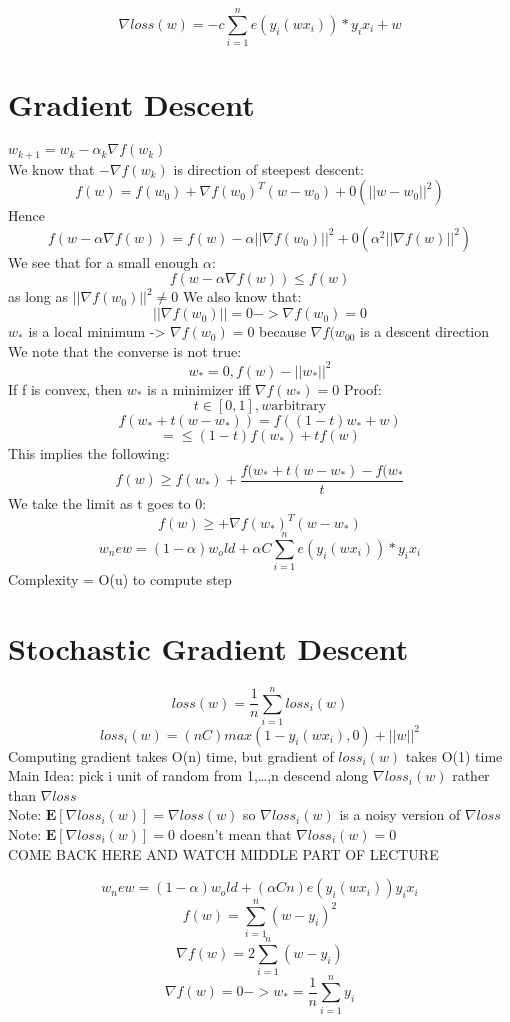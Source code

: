 \documentclass{article}
\begin{document}
$$\nabla loss(w) = -c \sum_{i=1}^n e(y_i(wx_i)) * y_ix_i + w$$

\section{Gradient Descent}
$w_{k+1} = w_k - \alpha_k \nabla f(w_k)$ \\ 
We know that $-\nabla f(w_k)$ is direction of steepest descent:
$$f(w) = f(w_0) + \nabla f(w_0)^T(w-w_0) + 0(||w-w_0||^2)$$
Hence 
$$f(w-\alpha \nabla f(w)) = f(w) - \alpha||\nabla f(w_0)||^2 + 0(\alpha^2 ||\nabla f(w)||^2)$$
We see that for a small enough $\alpha$:
$$f(w-\alpha \nabla f(w)) \leq f(w)$$
as long as $||\nabla f(w_0)||^2 \neq 0$
We also know that:
$$||\nabla f(w_0)|| = 0 -> \nabla f(w_0) = 0$$
$w_*$ is a local minimum -> $\nabla f(w_0) = 0$ because $\nabla f(w_00$ is a descent direction \\ 
We note that the converse is not true:
$$w_* = 0, f(w)-||w_*||^2$$
If f is convex, then $w_*$ is a minimizer iff $\nabla f(w_*) = 0$
Proof:
$$t \in [0,1], w \textrm{arbitrary}$$
$$f(w_* + t(w-w_*)) = f((1-t)w_* + w)$$
$$= \leq (1-t)f(w_*) + tf(w)$$
This implies the following:
$$f(w) \geq f(w_*) + \frac{f(w_* + t(w-w_*) - f(w_*}{t}$$
We take the limit as t goes to 0:
$$f(w) \geq + \nabla f(w_*)^T (w-w_*)$$
$$w_new = (1-\alpha)w_old + \alpha C \sum_{i=1}^n e(y_i(wx_i)) * y_ix_i$$
Complexity = O(u) to compute step

\section{Stochastic Gradient Descent}
$$loss(w) = \frac{1}{n} \sum_{i=1}^n loss_i(w)$$
$$loss_i(w) = (nC) max(1-y_i(wx_i),0) + ||w||^2$$
Computing gradient takes O(n) time, but gradient of $loss_i(w)$ takes O(1) time \\
Main Idea: pick i unit of random from {1,…,n} descend along $\nabla loss_i(w)$ rather than $\nabla loss$ \\ 
Note: $\mathbf{E}[\nabla loss_i(w)] = \nabla loss(w)$ so $\nabla loss_i(w)$ is a noisy version of $\nabla loss$ \\
Note: $\mathbf{E}[\nabla loss_i(w)] = 0$ doesn’t mean that $\nabla loss_i(w) = 0$ \\

COME BACK HERE AND WATCH MIDDLE PART OF LECTURE

$$w_new = (1- \alpha )w_old + (\alpha Cn) e(y_i(wx_i))y_ix_i$$
$$f(w) = \sum_{i=1}^n (w-y_i)^2$$
$$\nabla f(w) = 2 \sum_{i=1}^n (w-y_i)$$
$$\nabla f(w) = 0 -> w_* = \frac{1}{n}  \sum_{i=1}^n y_i$$
\end{document}
